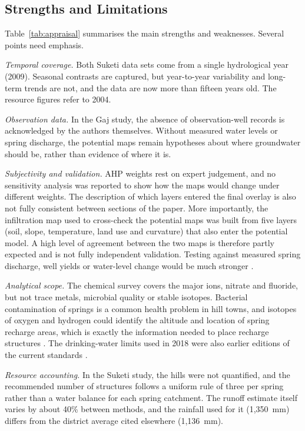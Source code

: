 \documentclass[10pt,a4paper,twocolumn]{article}
\begin{document}
\subsection{Strengths and Limitations}

Table~\ref{tab:appraisal} summarises the main strengths and weaknesses. Several points need
emphasis.

\textit{Temporal coverage.} Both Suketi data sets come from a single hydrological year (2009).
Seasonal contrasts are captured, but year-to-year variability and long-term trends are not, and
the data are now more than fifteen years old. The resource figures refer to 2004.

\textit{Observation data.} In the Gaj study, the absence of observation-well records is
acknowledged by the authors themselves. Without measured water levels or spring discharge, the
potential maps remain hypotheses about where groundwater should be, rather than evidence of
where it is.

\textit{Subjectivity and validation.} AHP weights rest on expert judgement, and no sensitivity
analysis was reported to show how the maps would change under different weights. The
description of which layers entered the final overlay is also not fully consistent between
sections of the paper. More importantly, the infiltration map used to cross-check the potential
maps was built from five layers (soil, slope, temperature, land use and curvature) that also
enter the potential model. A high level of agreement between the two maps is therefore partly
expected and is not fully independent validation. Testing against measured spring discharge,
well yields or water-level change would be much stronger \citep{machiwal2011,fawcett2006}.

\textit{Analytical scope.} The chemical survey covers the major ions, nitrate and fluoride, but
not trace metals, microbial quality or stable isotopes. Bacterial contamination of springs is a
common health problem in hill towns, and isotopes of oxygen and hydrogen could identify the
altitude and location of spring recharge areas, which is exactly the information needed to
place recharge structures \citep{niti2018}. The drinking-water limits used in 2018 were also
earlier editions of the current standards \citep{bis2012}.

\textit{Resource accounting.} In the Suketi study, the hills were not quantified, and the
recommended number of structures follows a uniform rule of three per spring rather than a water
balance for each spring catchment. The runoff estimate itself varies by about 40\% between
methods, and the rainfall used for it (1,350~mm) differs from the district average cited
elsewhere (1,136~mm).
\end{document}
